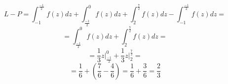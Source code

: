 \documentclass{article}
\begin{document}
\begin{equation*}
    L - P = \int_{-1}^{\frac{-1}{2}}f(z)dz + \int_{\frac{-1}{2}}^{0}f(z)dz + \int_{2}^{\frac{7}{2}}f(z)dz - \int_{-1}^{\frac{-1}{2}} f(z)dz =
\end{equation*}
\begin{equation*}
    = \int_{\frac{-1}{2}}^{0}f(z)dz + \int_{2}^{\frac{7}{2}}f(z)dz =
\end{equation*}
\begin{equation*}
    = \frac{1}{3}z \biggr\rvert_{\frac{-1}{2}}^{0} + \frac{1}{3}z \biggr\rvert_{2}^{\frac{7}{2}} =
\end{equation*}
\begin{equation*}
    = \frac{1}{6} + (\frac{7}{6} - \frac{4}{6}) = \frac{1}{6} + \frac{3}{6} = \frac{2}{3} 
\end{equation*}
 
\end{document}
